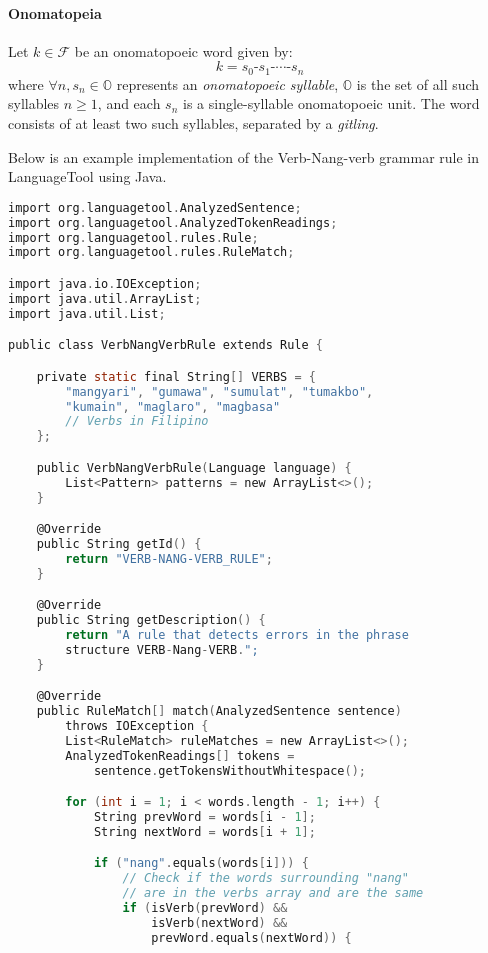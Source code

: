\paragraph{Onomatopeia} Let \( k \in \mathcal{F} \) be an onomatopoeic word given by:
\[
      k = s_0\texttt{-}s_1\texttt{-}\cdots\texttt{-}s_n 
\]
where \(\forall n, s_n \in \mathbb{O} \) represents an \textit{onomatopoeic syllable}, \( \mathbb{O} \) is the set of all such syllables \( n \geq 1 \), and each \( s_n \) is a single-syllable onomatopoeic unit. The word consists of at least two such syllables, separated by a \textit{gitling}.

Below is an example implementation of the Verb-Nang-verb grammar rule in LanguageTool using Java.

\begin{lstlisting}[language=C, caption=Implementation of Verb-Nang-Verb Grammar Rule in Java]
import org.languagetool.AnalyzedSentence;
import org.languagetool.AnalyzedTokenReadings;
import org.languagetool.rules.Rule;
import org.languagetool.rules.RuleMatch;

import java.io.IOException; 
import java.util.ArrayList;
import java.util.List;

public class VerbNangVerbRule extends Rule {

    private static final String[] VERBS = {
        "mangyari", "gumawa", "sumulat", "tumakbo", 
        "kumain", "maglaro", "magbasa"  
        // Verbs in Filipino
    };

    public VerbNangVerbRule(Language language) {
        List<Pattern> patterns = new ArrayList<>();
    }

    @Override
    public String getId() {
        return "VERB-NANG-VERB_RULE";
    }

    @Override
    public String getDescription() {
        return "A rule that detects errors in the phrase 
        structure VERB-Nang-VERB.";
    }

    @Override
    public RuleMatch[] match(AnalyzedSentence sentence) 
        throws IOException {
        List<RuleMatch> ruleMatches = new ArrayList<>();
        AnalyzedTokenReadings[] tokens = 
            sentence.getTokensWithoutWhitespace();

        for (int i = 1; i < words.length - 1; i++) {
            String prevWord = words[i - 1];
            String nextWord = words[i + 1];

            if ("nang".equals(words[i])) {
                // Check if the words surrounding "nang" 
                // are in the verbs array and are the same
                if (isVerb(prevWord) && 
                    isVerb(nextWord) && 
                    prevWord.equals(nextWord)) {
                    

\end{lstlisting}
